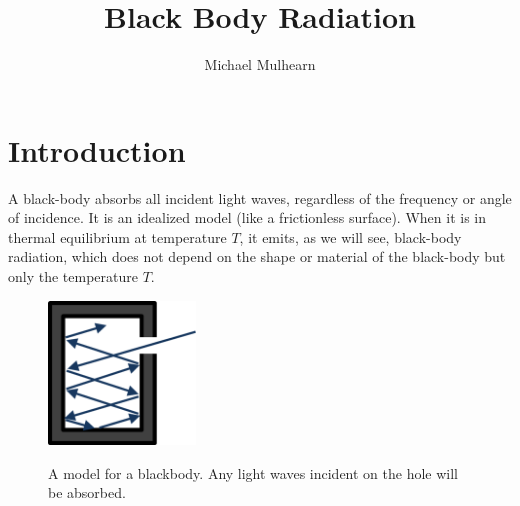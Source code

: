 \documentclass[12pt]{article}
\begin{document}
\newcommand{\pt}           {\ensuremath{ p_{\rm T} }}
\newcommand{\Et}           {\ensuremath{ E_{\rm t}     }}

\let\divsymb=\div %
\newcommand{\gv}[1]{\ensuremath{\mbox{\boldmath$ #1 $}}} 
\newcommand{\grad}[1]{\gv{\nabla} #1} %
\renewcommand{\div}[1]{\gv{\nabla} \cdot #1} %


\newcommand{\abs}[1]{\left| #1 \right|} %
\newcommand{\avg}[1]{\left< #1 \right>} %




\let\underdot=\d %
\renewcommand{\d}[2]{\frac{d #1}{d #2}} %
\newcommand{\dd}[2]{\frac{d^2 #1}{d #2^2}} %
\newcommand{\pd}[2]{\frac{\partial #1}{\partial #2}} %
\newcommand{\pdd}[2]{\frac{\partial^2 #1}{\partial #2^2}} %
\newcommand{\pdc}[3]{\left( \frac{\partial #1}{\partial #2} \right)_{#3}} %

\newcommand{\planewave}{e^{\textstyle i\vec{k} \cdot \vec{x}}}
\newcommand{\radialwave}{\frac{1}{r} \, e^{\textstyle ikr}} 

\title{Black Body Radiation}
\author{Michael Mulhearn}

\maketitle

\section{Introduction}

A black-body absorbs all incident light waves, regardless of the
frequency or angle of incidence.  It is an idealized model (like a
frictionless surface).  When it is in thermal equilibrium at
temperature $T$, it emits, as we will see, black-body radiation, which
does not depend on the shape or material of the black-body but only
the temperature $T$.

\begin{figure}[thb]
\begin{center}
{\includegraphics[width=0.35\textwidth]{figs/blackbody.png}}
\end{center}
\caption{\label{fig:blackbody} A model for a blackbody.  Any light waves incident on the hole will be absorbed.}
\end{figure}
\end{document}
